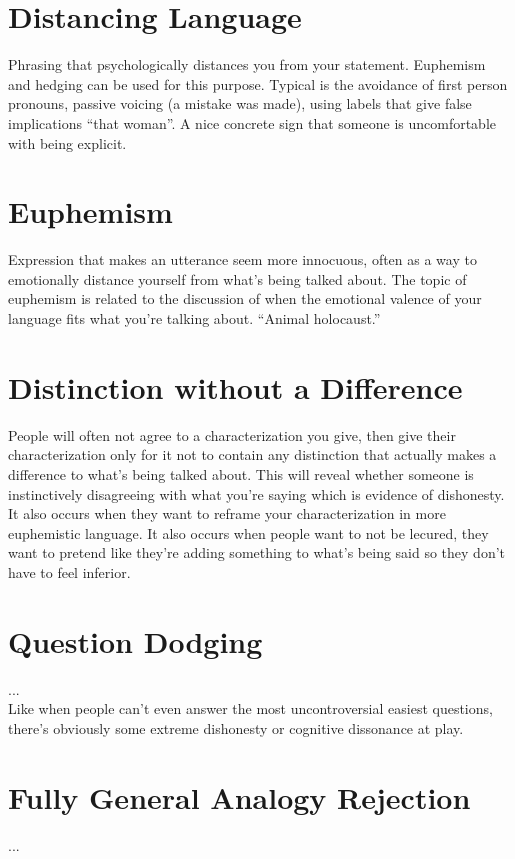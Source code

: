 \documentclass[12pt,english]{article}
\begin{document}
\section*{Distancing Language} Phrasing that psychologically distances you from your statement. Euphemism and hedging can be used for this purpose. Typical is the avoidance of first person pronouns, passive voicing (a mistake was made), using labels that give false implications “that woman”. A nice concrete sign that someone is uncomfortable with being explicit.

\section*{Euphemism} Expression that makes an utterance seem more innocuous, often as a way to emotionally distance yourself from what’s being talked about. The topic of euphemism is related to the discussion of when the emotional valence of your language fits what you’re talking about. “Animal holocaust.” 

\section*{Distinction without a Difference} People will often not agree to a characterization you give, then give their characterization only for it not to contain any distinction that actually makes a difference to what’s being talked about. This will reveal whether someone is instinctively disagreeing with what you’re saying which is evidence of dishonesty. It also occurs when they want to reframe your characterization in more euphemistic language. It also occurs when people want to not be lecured, they want to pretend like they're adding something to what's being said so they don't have to feel inferior.

\section*{Question Dodging} ...\\Like when people can't even answer the most uncontroversial easiest questions, there's obviously some extreme dishonesty or cognitive dissonance at play.

\section*{Fully General Analogy Rejection} ...
\end{document}
